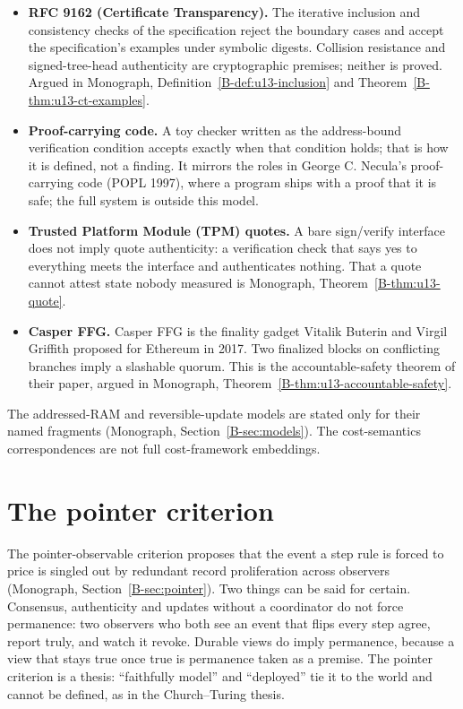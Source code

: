 \documentclass[11pt, a4paper]{report}
\theoremstyle{definition}
\theoremstyle{plain}
\begin{document}
\begin{itemize}
  \item \textbf{RFC 9162 (Certificate Transparency).} The iterative inclusion and consistency checks of the specification reject the boundary cases and accept the specification's examples under symbolic digests. Collision resistance and signed-tree-head authenticity are cryptographic premises; neither is proved. Argued in Monograph, Definition~\ref{B-def:u13-inclusion} and Theorem~\ref{B-thm:u13-ct-examples}.
  \item \textbf{Proof-carrying code.} A toy checker written as the address-bound verification condition accepts exactly when that condition holds; that is how it is defined, not a finding. It mirrors the roles in George C. Necula's proof-carrying code (POPL 1997), where a program ships with a proof that it is safe; the full system is outside this model.
  \item \textbf{Trusted Platform Module (TPM) quotes.} A bare sign/verify interface does not imply quote authenticity: a verification check that says yes to everything meets the interface and authenticates nothing. That a quote cannot attest state nobody measured is Monograph, Theorem~\ref{B-thm:u13-quote}.
  \item \textbf{Casper FFG.} Casper FFG is the finality gadget Vitalik Buterin and Virgil Griffith proposed for Ethereum in 2017. Two finalized blocks on conflicting branches imply a slashable quorum. This is the accountable-safety theorem of their paper, argued in Monograph, Theorem~\ref{B-thm:u13-accountable-safety}.
\end{itemize}

The addressed-RAM and reversible-update models are stated only for their named fragments (Monograph, Section~\ref{B-sec:models}). The cost-semantics correspondences are not full cost-framework embeddings.

\section{The pointer criterion}

The pointer-observable criterion proposes that the event a step rule is forced to price is singled out by redundant record proliferation across observers (Monograph, Section~\ref{B-sec:pointer}). Two things can be said for certain. Consensus, authenticity and updates without a coordinator do not force permanence: two observers who both see an event that flips every step agree, report truly, and watch it revoke. Durable views do imply permanence, because a view that stays true once true is permanence taken as a premise. The pointer criterion is a thesis: ``faithfully model'' and ``deployed'' tie it to the world and cannot be defined, as in the Church--Turing thesis.
\end{document}
